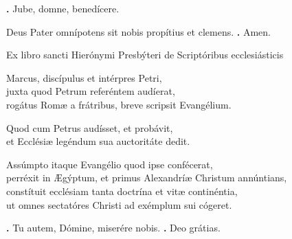 \begin{small}
\textbf{\Vbar.} Jube, domne, benedícere.

Deus Pater omnípotens sit nobis propítius et clemens.
\textbf{\Rbar.} Amen.
\end{small}


Ex libro sancti Hierónymi Presbýteri de Scriptóribus ecclesiásticis

Marcus, discípulus et intérpres Petri, \\
juxta quod Petrum referéntem audíerat, \\
rogátus Romæ a frátribus, breve scripsit Evangélium. 

Quod cum Petrus audísset, et probávit, \\
et Ecclésiæ legéndum sua auctoritáte dedit. 

Assúmpto itaque Evangélio quod ipse confécerat, \\
perréxit in Ægýptum, et primus Alexandríæ Christum annúntians,\\
constítuit ecclésiam tanta doctrína et vitæ continéntia, \\
ut omnes sectatóres Christi ad exémplum sui cógeret.

\textbf{\Vbar.} Tu autem, Dómine, miserére nobis.
\textbf{\Rbar.} Deo grátias.

